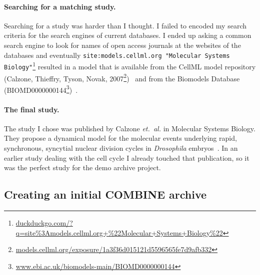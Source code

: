 \paragraph{Searching for a matching study.}
Searching for a study was harder than I thought.
I failed to encoded my search criteria for the search engines of current databases.
I ended up asking a common search engine to look for names of open access journals at the websites of the databases and eventually \texttt{site:models.cellml.org "Molecular Systems Biology"}\footnote{\href{https://duckduckgo.com/?q=site\%3Amodels.cellml.org+\%22Molecular+Systems+Biology\%22}{duckduckgo.com/?q=site\%3Amodels.cellml.org+\%22Molecular+Systems+Biology\%22}} resulted in a model that is available from the CellML model repository (Calzone, Thieffry, Tyson, Novak, 2007\footnote{\href{http://models.cellml.org/exposure/1a3f36d015121d5596565fe7d9afb332}{models.cellml.org/exposure/1a3f36d015121d5596565fe7d9afb332}})~\cite{cellmlrepo} and from the Biomodels Database (BIOMD0000000144\footnote{\href{http://www.ebi.ac.uk/biomodels-main/BIOMD0000000144}{www.ebi.ac.uk/biomodels-main/BIOMD0000000144}})~\cite{biomodels}.


\paragraph{The final study.}
The study I chose was published by Calzone \emph{et.~al.} in Molecular Systems Biology. They propose a dynamical model for the molecular events underlying rapid, synchronous, syncytial nuclear division cycles in \textit{Drosophila} embryos~\cite{Calzone2007}.
In an earlier study dealing with the cell cycle I already touched that publication, so it was the perfect study for the demo archive project.




\subsection{Creating an initial COMBINE archive}


